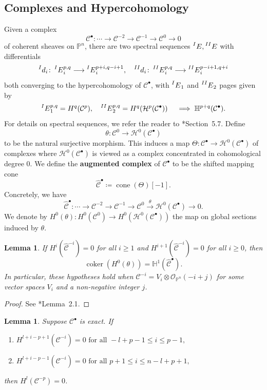 \documentclass[11pt,letterpaper,reqno]{amsart}
\newcommand{\coker}{\operatorname{coker}}
\newcommand{\mc}[1]{\mathcal{#1}}
\def\PP{{\mathbb P}}
\def\lra{\longrightarrow}
\newtheorem{lemma}[theorem]{Lemma}
\theoremstyle{definition}
\numberwithin{equation}{section}
\begin{document}
\subsection{Complexes and Hypercohomology}
Given a complex
\[\mc{C}^\bullet \colon \cdots \lra \mc{C}^{-2} \lra \mc{C}^{-1} \lra \mc{C}^{0} \lra 0\]
of coherent sheaves on $\PP^n$, there are two spectral sequences $\prescript{I}{}E,\prescript{II}{}E$ with differentials
\[\prescript{I}{}d_i \colon \prescript{I}{}E_i^{p,q} \lra \prescript{I}{}E_i^{p+i,q-i+1},\quad \prescript{II}{}d_i \colon \prescript{II}{}E_i^{p,q} \lra \prescript{II}{}E_i^{p-i+1,q+i}\]
both converging to the hypercohomology of $\mc{C}^\bullet$, with $\prescript{I}{}E_1$ and $\prescript{II}{}E_2$ pages given by
\[\prescript{I}{}E^{p,q}_1 = H^q(\mc{C}^p), \quad \prescript{II}{}E^{p,q}_2 = H^q(\mc{H}^p(\mc{C}^\bullet)) \quad \implies \mathbb{H}^{p+q}(\mc{C}^\bullet).\]
For details on spectral sequences, we refer the reader to \cite{Weibel}*{Section~5.7}. Define
\[\theta \colon \mc{C}^0 \lra \mc{H}^0(\mc{C}^\bullet)\]
to be the natural surjective morphism. This induces a map $\Theta \colon \mc{C}^\bullet \lra \mc{H}^0(\mc{C}^\bullet)$ of complexes where $\mc{H}^0(\mc{C}^\bullet)$ is viewed as a complex concentrated in cohomological degree $0$. We define the \textbf{augmented complex} of $\mc{C}^\bullet$ to be the shifted mapping cone
\[\widehat{\mc{C}}^\bullet \coloneqq \operatorname{cone}(\Theta)[-1].\]
Concretely, we have
\[\widehat{\mc{C}}^\bullet \colon \cdots \lra \mc{C}^{-2} \lra \mc{C}^{-1} \lra \mc{C}^{0} \overset{\theta}{\lra } \mc{H}^0(\mc{C}^\bullet) \lra 0.\]
We denote by $H^0(\theta) \colon H^0(\mc{C}^0) \lra H^0(\mc{H}^0(\mc{C}^\bullet))$ the map on global sections induced by $\theta$.
\begin{lemma}\label{lem:hypercohomology2}
    If $H^i\left(\widehat{\mc{C}}^{-i}\right) = 0$ for all $i \ge 1$ and $H^{i+1}\left(\widehat{\mc{C}}^{-i}\right)  = 0$ for all $i \ge 0$, then
    \[\coker(H^0(\theta)) = \mathbb{H}^1\left( \widehat{\mc{C}}^\bullet\right).\]
    In particular, these hypotheses hold when $\mc{C}^{-i} = V_i\otimes \mc{O}_{\PP^n}(-i + j)$ for some vector spaces $V_i$ and a non-negative integer $j$.
\end{lemma}
\begin{proof}
    See \cite{yang}*{Lemma~2.1}.
\end{proof}
\begin{lemma}\label{lem:hypercohomology1}
    Suppose $\mc{C}^\bullet$ is exact. If
    \begin{enumerate}
        \item $H^{l+i-p+1}(\mc{C}^{-i}) = 0 \text{ for all } -l+p-1\le  i\le p-1,$
        \item $H^{l+i-p-1}(\mc{C}^{-i}) = 0 \text{ for all } p+1 \le i \le n-l+p+1,$
    \end{enumerate}
    then $H^l(\mc{C}^{-p}) = 0$.
\end{lemma}
\end{document}
